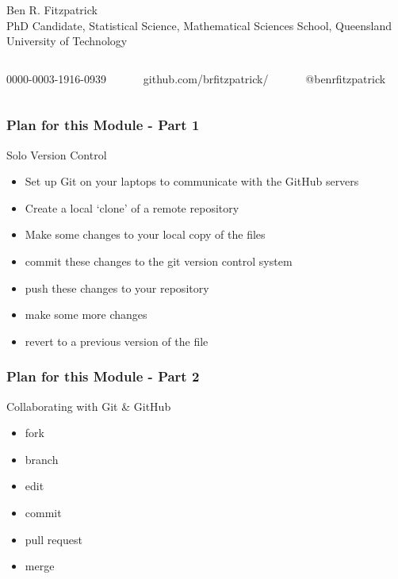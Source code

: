 \documentclass[xcolor=dvipsnames]{beamer}
\begin{document}
\begin{frame}
\begin{figure}
\begin{columns}
\end{columns}
\end{figure}

\small Ben R. Fitzpatrick\\
\tiny PhD Candidate, Statistical Science, Mathematical Sciences School, Queensland University of Technology
\newline
\begin{columns}
\begin{column}{3cm}
\tiny 0000-0003-1916-0939
\end{column}
\begin{column}{3cm}
\tiny github.com/brfitzpatrick/
\end{column}
\begin{column}{3cm}
\tiny @benrfitzpatrick
\end{column}
\end{columns}
\end{frame}


\begin{frame} 
\frametitle{Plan for this Module - Part 1}
\begin{block}{Solo Version Control}
\begin{itemize}
\item Set up Git on your laptops to communicate with the GitHub servers
\item Create a local `clone' of a remote repository
\item Make some changes to your local copy of the files
\item commit these changes to the git version control system
\item push these changes to your repository
\item make some more changes
\item revert to a previous version of the file
\end{itemize}
\end{block}
\end{frame}

\begin{frame} 
\frametitle{Plan for this Module - Part 2}

\begin{block}{Collaborating with Git \& GitHub}
\begin{itemize}
\item fork
\item branch 
\item edit
\item commit
\item pull request
\item merge
\end{itemize}
\end{block}

\end{frame}
\end{document}

